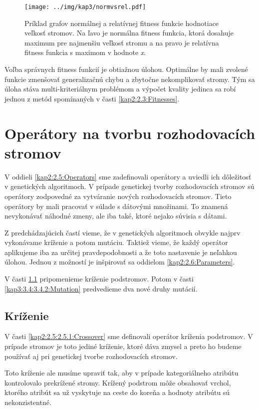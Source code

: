 \begin{figure}[h]
\centering
\centerline{\mbox{\texttt{[image: ../img/kap3/normvsrel.pdf]}}}
\caption{Príklad grafov normálnej a relatívnej fitness funkcie hodnotiace veľkosť stromov. Na ľavo je normálna fitness funkcia, ktorá dosahuje maximum pre najmenšiu veľkosť stromu a na pravo je relatívna fitness funkcia s maximom v hodnote \emph{x}.}\label{fig:normalvsrelative}
\end{figure}

Voľba správnych fitness funkcií je obtiažnou úlohou. Optimálne by mali zvolené funkcie zmenšovať generalizačnú chybu a zbytočne nekomplikovať stromy. Tým sa úloha stáva multi-kriteriálnym problémom a výpočet kvality jedinca sa robí jednou z metód spomínaných v časti \ref{kap2:2.3:Fitnesses}.
\section{Operátory na tvorbu rozhodovacích stromov}\label{kap3:3.4:Operators}
V oddieli \ref{kap2:2.5:Operators} sme zadefinovali operátory a uviedli ich dôležitosť v genetických algoritmoch. V prípade genetickej tvorby rozhodovacích stromov sú operátory zodpovedné za vytváranie nových rozhodovacích stromov. Tieto operátory by mali pracovať v súlade s dátovými množinami. To znamená nevykonávať náhodné zmeny, ale iba také, ktoré nejako súvisia s dátami.

Z predchádzajúcich častí vieme, že v genetických algoritmoch obvykle najprv vykonávame kríženie a potom mutáciu. Taktiež vieme, že každý operátor aplikujeme iba za určitej pravdepodobnosti a že toto nastavenie je neľahkou úlohou. Jednou z možností je inšpirovať sa oddielom \ref{kap2:2.6:Parameters}.

V časti \ref{kap3:3.4:3.4.1:Crossover} pripomenieme kríženie podstromov. Potom v časti \ref{kap3:3.4:3.4.2:Mutation} predvedieme dva nové druhy mutácií.

\subsection{Kríženie}\label{kap3:3.4:3.4.1:Crossover}
V časti \ref{kap2:2.5:2.5.1:Crossover} sme definovali operátor kríženia podstromov. V prípade stromov je toto jediné kríženie, ktoré dáva zmysel a preto ho budeme používať aj pri genetickej tvorbe rozhodovacích stromov. 

Toto kríženie ale musíme upraviť tak, aby v prípade kategoriálneho atribútu kontrolovalo prekrížené stromy. Krížený podstrom môže obsahovať vrchol, ktorého atribút sa už vyskytuje na ceste do koreňa a hodnoty atribútu sú nekonzistentné.

